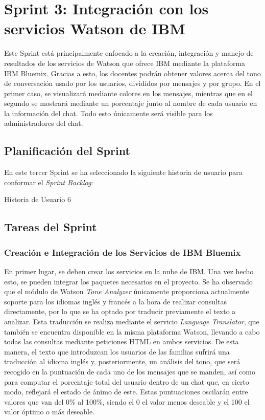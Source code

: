\clearpage

\section{Sprint 3: Integración con los servicios Watson de IBM}
Este Sprint está principalmente enfocado a la creación, integración y manejo de resultados de los servicios de Watson que ofrece IBM mediante la plataforma IBM Bluemix. Gracias a esto, los docentes podrán obtener valores acerca del tono de conversación usado por los usuarios, divididos por mensajes y por grupo. En el primer caso, se visualizará mediante colores en los mensajes, mientras que en el segundo se mostrará mediante un porcentaje junto al nombre de cada usuario en la información del chat. Todo esto únicamente será visible para los administradores del chat.

\subsection{Planificación del Sprint}
En este tercer Sprint se ha seleccionado la siguiente historia de usuario para conformar el \textit{Sprint Backlog}:

\begin{table}[hp]
	\centering
	{\small
		
	}
	\caption[Historia de Usuario 6]
	{Historia de Usuario 6}
	\label{tab:historia6}
\end{table}

\subsection{Tareas del Sprint}
\subsubsection{Creación e Integración de los Servicios de IBM Bluemix}
En primer lugar, se deben crear los servicios en la nube de IBM. Una vez hecho esto, se pueden integrar los paquetes necesarios en el proyecto. Se ha observado que el módulo de Watson \textit{Tone Analyzer} únicamente proporciona actualmente soporte para los idiomas inglés y francés a la hora de realizar consultas directamente, por lo que se ha optado por traducir previamente el texto a analizar. Esta traducción se realiza mediante el servicio \textit{Language Translator}, que también se encuentra disponible en la misma plataforma Watson, llevando a cabo todas las consultas mediante peticiones HTML en ambos servicios. De esta manera, el texto que introduzcan los usuarios de las familias sufrirá una traducción al idioma inglés y, posteriormente, un análisis del tono, que será recogido en la puntuación de cada uno de los mensajes que se manden, así como para computar el porcentaje total del usuario dentro de un chat que, en cierto modo, reflejará el estado de ánimo de este. Estas puntuaciones oscilarán entre valores que van del 0\% al 100\%, siendo el 0 el valor menos deseable y el 100 el valor óptimo o más deseable.

